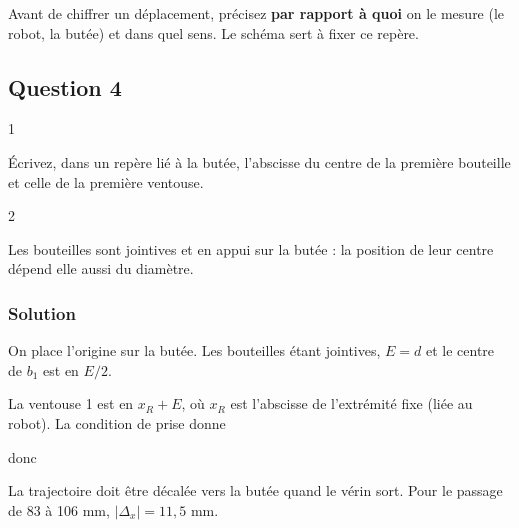 \documentclass[11pt,a4paper]{article}
\newcommand{\equationajustee}[1]{%
  \sbox{\boiteequation}{$\displaystyle #1$}%
  \ifdim\wd\boiteequation>\linewidth
    \[\resizebox{\linewidth}{!}{\usebox{\boiteequation}}\]%
  \else
    \[#1\]%
  \fi}
\begin{document}
\begin{methode}

Avant de chiffrer un déplacement, précisez \textbf{par rapport à quoi} on le mesure (le robot, la butée) et dans quel sens. Le schéma sert à fixer ce repère.

\end{methode}

\hypertarget{question-4}{%
\subsection{Question 4}\label{question-4}}

\begin{indication}{1}

Écrivez, dans un repère lié à la butée, l'abscisse du centre de la première bouteille et celle de la première ventouse.

\end{indication}

\begin{indication}{2}

Les bouteilles sont jointives et en appui sur la butée : la position de leur centre dépend elle aussi du diamètre.

\end{indication}

\hypertarget{solution-3}{%
\subsubsection{Solution}\label{solution-3}}

On place l'origine sur la butée. Les bouteilles étant jointives, \(E=d\) et le centre de \(b_1\) est en \(E/2\).

La ventouse 1 est en \(x_R+E\), où \(x_R\) est l'abscisse de l'extrémité fixe (liée au robot). La condition de prise donne

\equationajustee{\begin{aligned}
x_R+E&=\frac E2\\
x_R&=-\frac E2
\end{aligned}}

donc

\equationajustee{\begin{aligned}
\Delta_x&=-\frac{\Delta E}{2}\\
&=\boxed{-\frac{\Delta\lambda}{10}}
\end{aligned}}

La trajectoire doit être décalée vers la butée quand le vérin sort. Pour le passage de 83 à 106 mm, \(|\Delta_x|=11{,}5\) mm.
\end{document}
